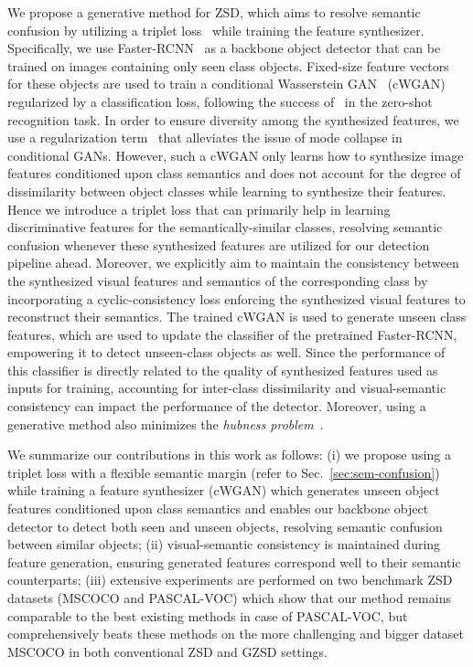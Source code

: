 \documentclass{bmvc2k}
\begin{document}
We propose a generative method for ZSD, which aims to resolve semantic confusion by utilizing a triplet loss~\cite{schroff2015facenet} while training the feature synthesizer. Specifically, we use Faster-RCNN~\cite{ren2016faster} as a backbone object detector that can be trained on images containing only seen class objects. Fixed-size feature vectors for these objects are used to train a conditional Wasserstein GAN~\cite{arjovsky2017wasserstein} (cWGAN) regularized by a classification loss, following the success of~\cite{xian2018feature} in the zero-shot recognition task. In order to ensure diversity among the synthesized features, we use a regularization term~\cite{mao2019mode} that alleviates the issue of mode collapse in conditional GANs. However, such a cWGAN only learns how to synthesize image features conditioned upon class semantics and does not account for the degree of dissimilarity between object classes while learning to synthesize their features. Hence we introduce a triplet loss that can primarily help in learning discriminative features for the semantically-similar classes, resolving semantic confusion whenever these synthesized features are utilized for our detection pipeline ahead. 
Moreover, we explicitly aim to maintain the consistency between the synthesized visual features and semantics of the corresponding class by incorporating a cyclic-consistency loss enforcing the synthesized visual features to reconstruct their semantics. The trained cWGAN is used to generate unseen class features, which are used to update the classifier of the pretrained Faster-RCNN, empowering it to detect unseen-class objects as well. Since the performance of this classifier is directly related to the quality of synthesized features used as inputs for training, accounting for inter-class dissimilarity and visual-semantic consistency can impact the performance of the detector. Moreover, using a generative method also minimizes the {\em hubness problem}~\cite{radovanovic2010hubs, dinu2014improving, shigeto2015ridge, gupta2020multi, zhao2020gtnet, hayat2020synthesizing}.

We summarize our contributions in this work as follows: (i) we propose using a triplet loss with a flexible semantic margin (refer to Sec.~\ref{sec:sem-confusion}) while training a feature synthesizer (cWGAN) which generates unseen object features conditioned upon class semantics and enables our backbone object detector to detect both seen and unseen objects, resolving semantic confusion between similar objects; (ii) visual-semantic consistency is maintained during feature generation, ensuring generated features correspond well to their semantic counterparts; (iii) extensive experiments are performed on two benchmark ZSD datasets (MSCOCO and PASCAL-VOC) which show that our method remains comparable to the best existing methods in case of PASCAL-VOC, but comprehensively beats these methods on the more challenging and bigger dataset MSCOCO in both conventional ZSD and GZSD settings.
\end{document}
